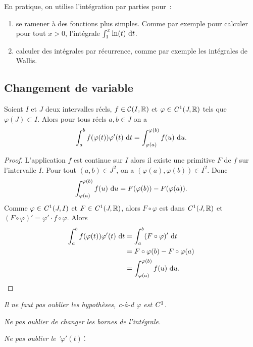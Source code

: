 En pratique, on utilise l'intégration par parties pour~:
\begin{enumerate}
\item se ramener à des fonctions plus simples. Comme par exemple pour calculer pour tout $x>0$, l'intégrale $\int_1^x \ln(t)\,\mathop{}\mathopen{}\mathrm{d} t$.
\item calculer des intégrales par récurrence, comme par exemple les intégrales de Wallis.
\end{enumerate}

\subsection{Changement de variable}

\begin{theo}
  Soient $I$ et $J$ deux intervalles réels, $f \in \mathcal{C}(I,\mathbb{R})$ et $\varphi \in \mathit{C}^1(J,\mathbb{R})$ tels que $\varphi(J) \subset I$. Alors pour tous réels $a, b \in J$ on a
  \begin{equation}
    \int_a^b f(\varphi(t)) \varphi'(t)\,\mathop{}\mathopen{}\mathrm{d} t = \int_{\varphi(a)}^{\varphi(b)} f(u)\,\mathop{}\mathopen{}\mathrm{d} u.
  \end{equation}
\end{theo}
\begin{proof}
  L'application $f$ est continue sur $I$ alors il existe une primitive $F$ de $f$ sur l'intervalle $I$. Pour tout $(a,b) \in J^2$, on a $(\varphi(a), \varphi(b)) \in I^2$. Donc
  \begin{equation}
    \int_{\varphi(a)}^{\varphi(b)}f(u)\,\mathop{}\mathopen{}\mathrm{d} u = F(\varphi(b)) - F(\varphi(a)).
  \end{equation}
  Comme $\varphi \in \mathit{C}^1(J,I)$ et $F \in \mathit{C}^1(J,\mathbb{R})$, alors $F \circ \varphi$ est dans  $\mathit{C}^1(J,\mathbb{R})$ et $(F\circ \varphi)'=\varphi' \cdot f \circ \varphi$. Alors
  \begin{align}
    \int_a^b f(\varphi(t)) \varphi'(t)\,\mathop{}\mathopen{}\mathrm{d} t &= \int_a^b (F\circ \varphi)'\,\mathop{}\mathopen{}\mathrm{d} t\\
    &=F\circ \varphi(b) - F\circ \varphi(a) \\
    &=\int_{\varphi(a)}^{\varphi(b)}f(u)\,\mathop{}\mathopen{}\mathrm{d} u.
  \end{align}
\end{proof}

\danger \emph{Il ne faut pas oublier les hypothèses, c-à-d $\varphi$ est $\mathit{C}^1$.}

\danger \emph{Ne pas oublier de changer les bornes de l'intégrale.}

\danger \emph{Ne pas oublier le '$\varphi'(t)$'.}


